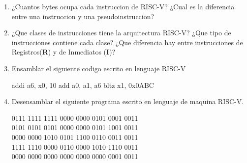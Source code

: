 \begin{enunciado}{\ejercicio}
    \begin{enumerate}
        \item ¿Cuantos bytes ocupa cada instruccion de RISC-V? ¿Cual es la diferencia entre una
        instruccion y una pseudoinstruccion?

        \item ¿Que clases de instrucciones tiene la arquitectura RISC-V? ¿Que tipo de instrucciones 
        contiene cada clase? ¿Que diferencia hay entre instrucciones de Registros(\textbf{R}) y de Inmediatos
        (\textbf{I})?

        \item Ensamblar el siguiente codigo escrito en lenguaje RISC-V
        
        \begin{riscv}
    addi a6, x0, 10
    add a0, a1, a6
    bltz x1, 0x0ABC        
        \end{riscv}

        \item Desensamblar el siguiente programa escrito en lenguaje de maquina RISC-V.

        \begin{center}
            0111 1111 1111 0000 0000 0101 0001 0011 \\
            0101 0101 0101 0000 0000 0101 1001 0011 \\
            0000 0000 1010 0101 1100 0110 0011 0011 \\
            1111 1110 0000 0110 0000 1010 1110 0011 \\
            0000 0000 0000 0000 0000 0000 0001 0011 \\
        \end{center}
    \end{enumerate}
    \end{enunciado}

